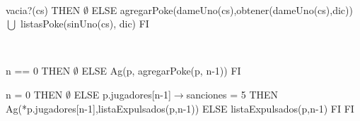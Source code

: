 \begin{Representacion}
	~

	{\IF vacia?(cs) THEN
		$\emptyset$
	ELSE
		agregarPoke(dameUno(cs),obtener(dameUno(cs),dic)) $\bigcup$ listasPoke(sinUno(cs), dic)
	FI}
		
	~

	{\IF n == 0 THEN
		$\emptyset$
	ELSE
		Ag(p, agregarPoke(p, n-1))
	FI}
	
	{\IF n = 0 THEN
		$\emptyset$
	ELSE
		{\IF p.jugadores[n-1]$\rightarrow$sanciones = 5 THEN
			Ag(*p.jugadores[n-1],listaExpulsados(p,n-1))
		ELSE
			listaExpulsados(p,n-1)
		FI}
	FI}
	
	


\end{Representacion}


